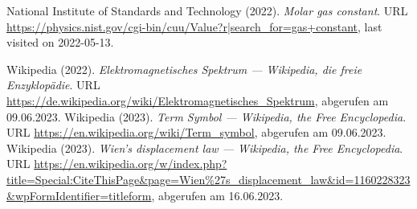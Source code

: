 \documentclass[../main.tex]{subfiles}
\begin{document}
\begin{thebibliography}{99}
		 National Institute of Standards and Technology (2022). \emph{Molar gas constant}. URL \url{https://physics.nist.gov/cgi-bin/cuu/Value?r|search_for=gas+constant}, last visited on 2022-05-13.

		 Wikipedia (2022). \emph{Elektromagnetisches Spektrum --- Wikipedia{,} die freie Enzyklopädie}. URL \url{https://de.wikipedia.org/wiki/Elektromagnetisches_Spektrum}, abgerufen am 09.06.2023.
		 Wikipedia (2023). \emph{Term Symbol --- Wikipedia{,} the Free Encyclopedia}. URL \url{https://en.wikipedia.org/wiki/Term_symbol}, abgerufen am 09.06.2023.
		 Wikipedia (2023). \emph{Wien's displacement law --- Wikipedia{,} the Free Encyclopedia}. URL \url{https://en.wikipedia.org/w/index.php?title=Special:CiteThisPage&page=Wien%27s_displacement_law&id=1160228323&wpFormIdentifier=titleform}, abgerufen am 16.06.2023.

		
	\end{thebibliography}
\end{document}
